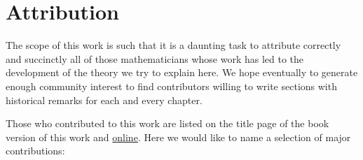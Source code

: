 \section{Attribution}
\label{section-attribution}

\noindent
The scope of this work is such that it is a daunting task to attribute
correctly and succinctly all of those mathematicians whose work has led
to the development of the theory we try to explain here. We hope eventually
to generate enough community interest to find contributors willing to write
sections with historical remarks for each and every chapter.

\medskip\noindent
Those who contributed to this work are listed on the title page of the book
version of this work and
\href{http://automorphic.newark.rutgers.edu/tex/CONTRIBUTORS}{online}.
Here we would like to name a selection of major contributions:
